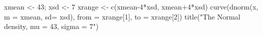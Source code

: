\begin{Schunk}
\begin{Sinput}
  xmean <- 43; xsd <- 7
  xrange <- c(xmean-4*xsd, xmean+4*xsd)
  curve(dnorm(x, m = xmean, sd= xsd), from = xrange[1], to = xrange[2])
  title("The Normal density, mu = 43, sigma = 7")
\end{Sinput}
\end{Schunk}
